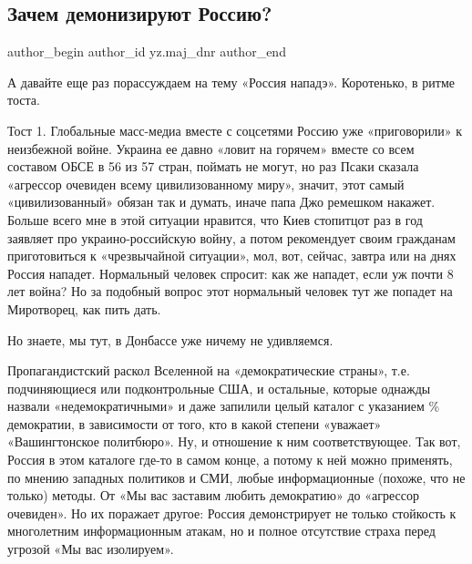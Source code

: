  
 
 
 
 
 
\subsection{Зачем демонизируют Россию?}
\label{sec:03_02_2022.yz.maj_dnr.1.zachem_demonizirujut_rossiu}
 
\ifcmt
 author_begin
   author_id yz.maj_dnr
 author_end
\fi

А давайте еще раз порассуждаем на тему «Россия нападэ». Коротенько, в ритме
тоста.

Тост 1. Глобальные масс-медиа вместе с соцсетями Россию уже «приговорили» к
неизбежной войне. Украина ее давно «ловит на горячем» вместе со всем составом
ОБСЕ в 56 из 57 стран, поймать не могут, но раз Псаки сказала «агрессор
очевиден всему цивилизованному миру», значит, этот самый «цивилизованный»
обязан так и думать, иначе папа Джо ремешком накажет. Больше всего мне в этой
ситуации нравится, что Киев стопитцот раз в год заявляет про украино-российскую
войну, а потом рекомендует своим гражданам приготовиться к «чрезвычайной
ситуации», мол, вот, сейчас, завтра или на днях Россия нападет. Нормальный
человек спросит: как же нападет, если уж почти 8 лет война? Но за подобный
вопрос этот нормальный человек тут же попадет на Миротворец, как пить дать.


Но знаете, мы тут, в Донбассе уже ничему не удивляемся.

Пропагандистский раскол Вселенной на «демократические страны», т.е.
подчиняющиеся или подконтрольные США, и остальные, которые однажды назвали
«недемократичными» и даже запилили целый каталог с указанием \% демократии, в
зависимости от того, кто в какой степени «уважает» «Вашингтонское политбюро».
Ну, и отношение к ним соответствующее. Так вот, Россия в этом каталоге где-то в
самом конце, а потому к ней можно применять, по мнению западных политиков и
СМИ, любые информационные (похоже, что не только) методы. От «Мы вас заставим
любить демократию» до «агрессор очевиден». Но их поражает другое: Россия
демонстрирует не только стойкость к многолетним информационным атакам, но и
полное отсутствие страха перед угрозой «Мы вас изолируем».

